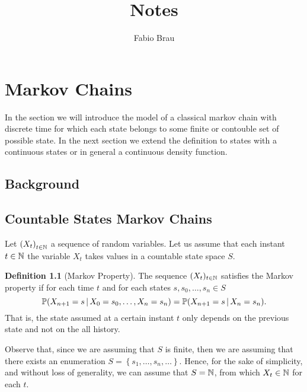 \documentclass{report}
\title{Notes}
\author{Fabio Brau}
\theoremstyle{definition}
\newtheorem{defn}{Definition}
\begin{document}
\maketitle
\tableofcontents
\chapter{Markov Chains}
In the section we will introduce the model of a classical markov chain with
discrete time for which each state belongs to some finite or contouble set of
possible state. In the next section we extend the definition to states with a
continuous states or in general a continuous density function.
\section{Background}
\section{Countable States Markov Chains}
Let $\left( X_t \right)_{t\in\mathbb{N}}$ a sequence of random variables. Let us
assume that each instant $t\in\mathbb{N}$ the variable $X_t$ takes values in a countable state space $S$. 
\begin{defn}[Markov Property]
The sequence $(X_t)_{t\in\mathbb{N}}$ satisfies the Markov property if for each time
$t$ and for each states $s,s_0,\dots,s_n\in S$
\begin{equation}
  \mathbb{P}(X_{n+1}=s\,\vert\,
  X_0=s_0,\dots,X_n=s_n)=\mathbb{P}(X_{n+1}=s\,\vert\, X_n=s_n).
  \label{eq:markov-property}
\end{equation}
That is, the state assumed at a certain instant $t$ only depends on the
previous state and not on the all history.
\end{defn}

Observe that, since we are assuming that $S$ is finite, then we are assuming
that there exists an enumeration $S=\left\{ s_1,\dots,s_n,\dots \right\}$.
Hence,  for the sake of simplicity, and without loss of generality, we can
assume that $S=\mathbb{N}$, from which $X_t\in\mathbb{N}$ for each $t$.
\end{document}
